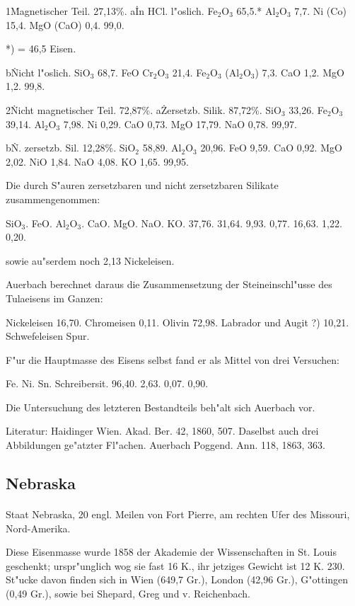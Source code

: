 \documentclass[a4paper, 11pt, oneside]{article}
\begin{document}
1\. Magnetischer Teil. 27,13\%.  
a\. In HCl. l"oslich.  
Fe$_{2}$O$_{3}$ 65,5.*  
Al$_{2}$O$_{3}$ 7,7.  
Ni (Co) 15,4.  
MgO (CaO) 0,4.  
99,0.

*) = 46,5 Eisen.

b\. Nicht l"oslich.  
SiO$_{3}$ 68,7.  
FeO Cr$_{2}$O$_{3}$ 21,4.  
Fe$_{2}$O$_{3}$ (Al$_{2}$O$_{3}$) 7,3.  
CaO 1,2.  
MgO 1,2.  
99,8.

2\. Nicht magnetischer Teil. 72,87\%.
a\. Zersetzb. Silik. 87,72\%.
SiO$_{3}$ 33,26.
Fe$_{2}$O$_{3}$ 39,14.
Al$_{2}$O$_{3}$ 7,98.
Ni 0,29.
CaO 0,73.
MgO 17,79.
NaO 0,78.
99,97.

b\. N. zersetzb. Sil. 12,28\%.  
SiO$_{2}$ 58,89.  
Al$_{2}$O$_{3}$ 20,96.  
FeO 9,59.  
CaO 0,92.  
MgO 2,02.  
NiO 1,84.  
NaO 4,08.  
KO 1,65.  
99,95.

Die durch S"auren zersetzbaren und nicht zersetzbaren Silikate zusammengenommen:

SiO$_{3}$. FeO. Al$_{2}$O$_{3}$. CaO. MgO. NaO. KO.  
37,76. 31,64. 9,93. 0,77. 16,63. 1,22. 0,20.

sowie au"serdem noch 2,13 Nickeleisen.

Auerbach berechnet daraus die Zusammensetzung der Steineinschl"usse des Tulaeisens im Ganzen:

Nickeleisen 16,70.  
Chromeisen 0,11.  
Olivin 72,98.  
Labrador und Augit ?) 10,21.  
Schwefeleisen Spur.

F"ur die Hauptmasse des Eisens selbst fand er als Mittel von drei Versuchen:

Fe. Ni. Sn. Schreibersit.  
96,40. 2,63. 0,07. 0,90.

Die Untersuchung des letzteren Bestandteils beh"alt sich Auerbach vor.

\footnotesize
Literatur: Haidinger Wien. Akad. Ber. 42, 1860, 507. Daselbst auch drei Abbildungen ge"atzter Fl"achen. Auerbach Poggend. Ann. 118, 1863, 363.

\subsection{Nebraska}
\normalsize
\paragraph{}
Staat Nebraska, 20 engl. Meilen von Fort Pierre, am rechten Ufer des Missouri, Nord-Amerika.

Diese Eisenmasse wurde 1858 der Akademie der Wissenschaften in St. Louis geschenkt; urspr"unglich wog sie fast 16 K., ihr jetziges Gewicht ist 12 K. 230. St"ucke davon finden sich in Wien (649,7 Gr.), London (42,96 Gr.), G"ottingen (0,49 Gr.), sowie bei Shepard, Greg und v. Reichenbach.
\end{document}
